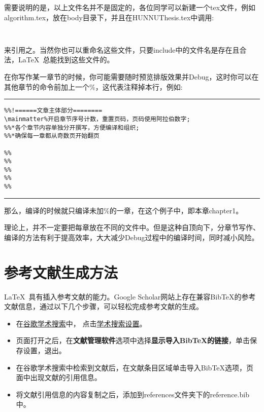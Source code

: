 需要说明的是，以上文件名并不是固定的，各位同学可以新建一个tex文件，例如algorithm.tex，放在body目录下，并且在HUNNUThesis.tex中调用:
\begin{verbatim}
	
\end{verbatim}
来引用之。当然你也可以重命名这些文件，只要include中的文件名是存在且合法，\LaTeX~总能找到这些文件的。

在你写作某一章节的时候，你可能需要随时预览排版效果并Debug，这时你可以在其他章节的\verb||命令前加上一个\%，这代表注释掉本行，例如:

\vspace{1em}\noindent\hrule

\begin{verbatim}
%%!======文章主体部分========
\mainmatter%开启章节序号计数，重置页码，页码使用阿拉伯数字;
%%*各个章节内容单独分开撰写，方便编译和组织;
%%*确保每一章都从奇数页开始翻页

%%
%%
%%
%%
%%
\end{verbatim}

\noindent\hrule\vspace{1em}

那么，编译的时候就只编译未加\%的一章，在这个例子中，即本章chapter1。

理论上，并不一定要把每章放在不同的文件中。但是这种自顶向下，分章节写作、编译的方法有利于提高效率，大大减少Debug过程中的编译时间，同时减小风险。
\section{参考文献生成方法}
\LaTeX~具有插入参考文献的能力。Google Scholar网站上存在兼容BibTeX的参考文献信息，通过以下几个步骤，可以轻松完成参考文献的生成。
\begin{itemize}
	\item 在\href{http://scholar.google.com/}{谷歌学术搜索}中，
	      点击\href{http://scholar.google.com/scholar_preferences?hl=en&as_sdt=0,5}{学术搜索设置}。
	\item 页面打开之后，在{\bf 文献管理软件}选项中选择{\bf 显示导入BibTeX的链接}，单击保存设置，退出。
	\item 在谷歌学术搜索中检索到文献后，在文献条目区域单击导入BibTeX选项，页面中出现文献的引用信息。
	\item 将文献引用信息的内容复制之后，添加到references文件夹下的reference.bib中。
\end{itemize}
